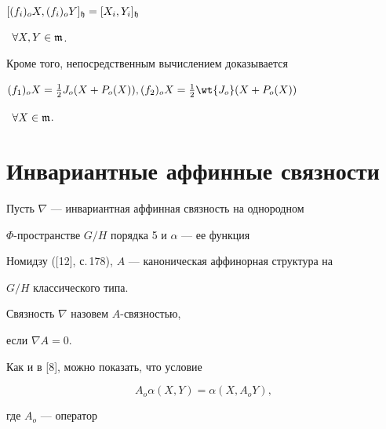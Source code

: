 \begin{lem}


$[(f_i)_oX,(f_i)_oY]_{\frak{h}}=[X_i,Y_i]_{\frak{h}}$


\ $\forall X,Y \in \frak{m}$.


\end{lem}





Кроме того, непосредственным вычислением доказывается





\begin{lem}


$(f_1)_oX=\frac{1}{2}J_o(X+P_o(X)),(f_2)_oX=\frac{1}{2}\wt{J_o}(X+P_o(X))$


\ $\forall X \in \frak{m}$.


\end{lem}








\section{Инвариантные аффинные связности}





Пусть $\nabla$ --- инвариантная аффинная связность на однородном


$\Phi$-пространстве $G/H$ порядка 5 и $\alpha$ --- ее функция


Номидзу ([12], с.\,178), $A$ --- каноническая аффинорная структура на


$G/H$ классического типа.





\begin{defn}


Связность $\nabla$ назовем $A$-связностью,


если $\nabla A=0$.


\end{defn}





Как и в [8], можно показать, что условие


$$


A_o\alpha(X,Y)=\alpha(X,A_oY),


$$


где $A_o$ --- оператор


